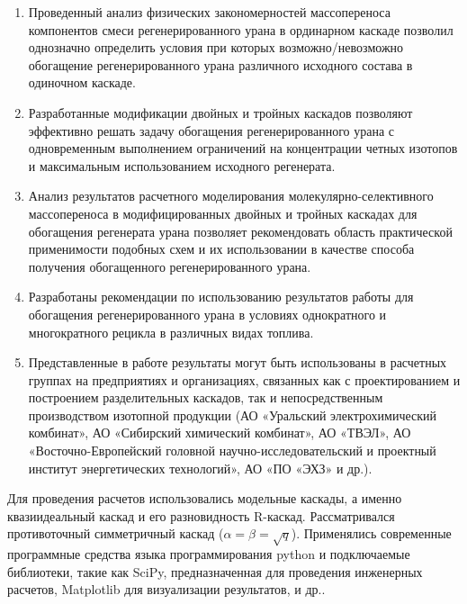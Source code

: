 {\influence} 
\begin{enumerate}
  \item Проведенный анализ физических закономерностей массопереноса компонентов смеси регенерированного урана в ординарном каскаде позволил однозначно определить условия при которых возможно/невозможно обогащение регенерированного урана различного исходного состава в одиночном каскаде.
  \item Разработанные модификации двойных и тройных каскадов позволяют эффективно решать задачу обогащения регенерированного урана с одновременным выполнением ограничений на концентрации четных изотопов и максимальным использованием исходного регенерата.
  \item Анализ результатов расчетного моделирования молекулярно-селективного массопереноса в модифицированных двойных и тройных каскадах для обогащения регенерата урана позволяет рекомендовать область практической применимости подобных схем и их использовании в качестве способа получения обогащенного регенерированного урана.
  \item Разработаны рекомендации по использованию результатов работы для обогащения регенерированного урана в условиях однократного и многократного рецикла в различных видах топлива.
  \item  Представленные в работе результаты могут быть использованы в расчетных группах на предприятиях и организациях, связанных как с проектированием и построением разделительных каскадов, так и непосредственным производством изотопной продукции (АО «Уральский электрохимический комбинат», АО «Сибирский химический комбинат», АО «ТВЭЛ», АО «Восточно-Европейский головной научно-исследовательский и проектный институт энергетических технологий», АО «ПО «ЭХЗ» и др.).
\end{enumerate}

{\methods} Для проведения расчетов использовались модельные каскады, а именно квазиидеальный каскад и его разновидность R-каскад. Рассматривался противоточный симметричный каскад ($\alpha=\beta=\sqrt{q}$). Применялись современные программные средства языка программирования python и подключаемые библиотеки, такие как SciPy, предназначенная для проведения инженерных расчетов, Matplotlib для визуализации результатов, и др..

